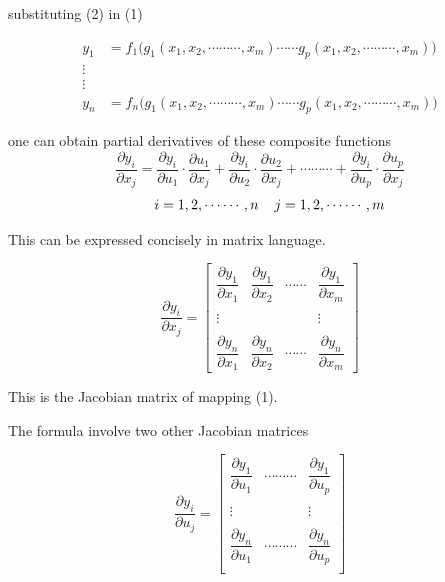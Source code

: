 \documentclass[11pt,a4paper]{article}
\theoremstyle{definition}
\begin{document}
substituting (2) in (1)

\begin{align*}
y_1 & = f_1\big( g_1(x_1,x_2,\cdots\cdots\cdots, x_m) \cdots\cdots g_p (x_1,x_2,\cdots\cdots\cdots, x_m)\big)\\
\vdots & \\
\vdots & \\
y_n & = f_n \big(g_1(x_1,x_2,\cdots\cdots\cdots, x_m)\cdots\cdots g_p (x_1,x_2,\cdots\cdots\cdots, x_m)\big)
\end{align*}

one can obtain partial derivatives of these composite functions
$$\frac{\partial y_i}{\partial x_j} = \frac{\partial y_i}{\partial u_1}\cdot \frac{\partial u_1}{\partial x_j} + \frac{\partial y_i}{\partial u_2}\cdot\frac{\partial u_2}{\partial x_j} + \cdots\cdots\cdots + \frac{\partial y_i}{\partial u_p}\cdot\frac{\partial u_p}{\partial x_j}$$ $$\hspace{0.5cm} i = 1,2,\cdots\cdots, n\hspace{0.4cm} j = 1,2,\cdots\cdots, m$$

This can be expressed concisely in matrix language.

$$\frac{\partial y_i}{\partial x_j}=
\begin{bmatrix}
\dfrac{\partial y_1}{\partial x_1} & \dfrac{\partial y_1}{\partial x_2} & \cdots\cdots & \dfrac{\partial y_1}{\partial x_m}\\\\
\vdots & && \vdots\\\\
\dfrac{\partial y_n}{\partial x_1} & \dfrac{\partial y_n}{\partial x_2} & \cdots\cdots & \dfrac{\partial y_n}{\partial x_m}
\end{bmatrix}
$$

This is the Jacobian matrix of mapping (1).


The formula involve two other Jacobian matrices

$$ \frac{\partial y_i}{\partial u_j}=
\begin{bmatrix}
\dfrac{\partial y_1}{\partial u_1} & \cdots\cdots\cdots & \dfrac{\partial y_1}{\partial u_p}\\\\
\vdots &&\vdots\\\\
\dfrac{\partial y_n}{\partial u_1} & \cdots\cdots\cdots & \dfrac{\partial y_n}{\partial u_p}\\
\end{bmatrix}
$$
\end{document}
